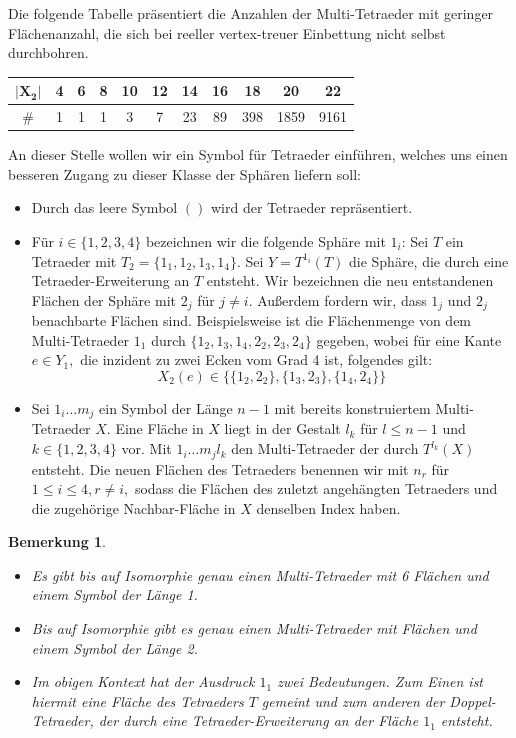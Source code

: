 \documentclass[12pt,titlepage,twoside,cleardoublepage]{article}
\theoremstyle{nummermitklammern}
\newtheorem{bemerkung}[temp]{Bemerkung}
\newtheorem{bemerkung}[zahl]{Bemerkung}
\numberwithin{equation}{section}
\begin{document}
Die folgende Tabelle präsentiert die Anzahlen der Multi-Tetraeder mit geringer Flächenanzahl, die sich bei reeller vertex-treuer Einbettung nicht selbst durchbohren.  
\begin{center}
\begin{tabular}{|c|c|c|c|c|c|c|c|c|c|c|}
\hline
$\vert\textbf{X}_{\textbf{2}}\vert$&\textbf{4}&\textbf{6}&\textbf{8}&\textbf{10}&\textbf{12}&\textbf{14}&\textbf{16}&\textbf{18}&\textbf{20}&\textbf{22}\\
\hline
$\#$&1&1&1&3&7&23&89&398&1859&9161\\
\hline
\end{tabular}
\end{center} 
An dieser Stelle wollen wir ein Symbol für Tetraeder einführen, welches uns einen besseren Zugang zu dieser Klasse der Sphären liefern soll: \\
\begin{itemize}
\item Durch das leere Symbol $()$ wird der Tetraeder repräsentiert. 
\item Für $i \in \{1,2,3,4\}$ bezeichnen wir die folgende Sphäre mit $1_i$: 
Sei $T$ ein Tetraeder mit $T_2=\{1_1,1_2,1_3,1_4\}.$ Sei $Y=T^{1_i}(T)$ die Sphäre, die durch eine Tetraeder-Erweiterung an $T$ entsteht. Wir bezeichnen die neu entstandenen Flächen der Sphäre mit $2_j$ für $j\neq i.$
 Außerdem fordern wir, dass $1_j$ und $2_j$ benachbarte Flächen sind. Beispielsweise ist die Flächenmenge von dem Multi-Tetraeder $1_1$ durch $\{1_2,1_3,1_4,2_2,2_3,2_4\}$ gegeben, wobei für eine Kante $e\in Y_1,$ die inzident zu zwei Ecken vom Grad 4 ist, folgendes gilt:
\[
X_2(e)\in\{\{1_2,2_2\},\{1_3,2_3\},\{1_4,2_4\}\}
\] 
\item Sei $1_i\ldots m_j$ ein Symbol der Länge $n-1$ mit bereits konstruiertem Multi-Tetraeder $X$.
 Eine Fläche in $X$ liegt in der Gestalt $l_k$ für $l\leq n-1$ und $k\in \{1,2,3,4\}$ vor. Mit $1_i\ldots m_jl_k$ den Multi-Tetraeder der durch $T^{l_k}(X)$ entsteht. Die neuen Flächen des Tetraeders benennen wir mit $n_r$ für $1\leq i\leq 4, r\neq i,$ sodass die Flächen des zuletzt angehängten Tetraeders und die zugehörige Nachbar-Fläche in $X$ denselben Index haben. 
\end{itemize}
\begin{bemerkung}
\begin{itemize}
\item Es gibt bis auf Isomorphie genau einen Multi-Tetraeder mit 6 Flächen und einem Symbol der Länge 1.
\item Bis auf Isomorphie gibt es genau einen Multi-Tetraeder mit Flächen und einem Symbol der Länge 2.
\item Im obigen Kontext hat der Ausdruck $1_1$ zwei Bedeutungen. Zum Einen ist hiermit eine Fläche des Tetraeders $T$ gemeint und zum anderen der Doppel-Tetraeder, der durch eine Tetraeder-Erweiterung an der Fläche $1_1$ entsteht.  
\end{itemize}
\end{bemerkung}
\end{document}
